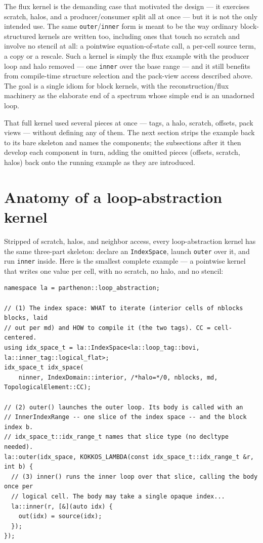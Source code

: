 \documentclass[11pt]{article}
\newcommand{\code}[1]{\lstinline[basicstyle=\ttfamily]|#1|}
\begin{document}
The flux kernel is the demanding case that motivated the design --- it exercises
scratch, halos, and a producer/consumer split all at once --- but it is not the
only intended use. The same \code{outer}/\code{inner} form is meant to be the way
ordinary block-structured kernels are written too, including ones that touch no
scratch and involve no stencil at all: a pointwise equation-of-state call, a
per-cell source term, a copy or a rescale. Such a kernel is simply the flux
example with the producer loop and halo removed --- one \code{inner} over the base
range --- and it still benefits from compile-time structure selection and the
pack-view access described above. The goal is a single idiom for block kernels,
with the reconstruction/flux machinery as the elaborate end of a spectrum whose
simple end is an unadorned loop.

That full kernel used several pieces at once --- tags, a halo, scratch, offsets,
pack views --- without defining any of them. The next section strips the example
back to its bare skeleton and names the components; the subsections after it then
develop each component in turn, adding the omitted pieces (offsets, scratch, halos)
back onto the running example as they are introduced.

\section{Anatomy of a loop-abstraction kernel}
\label{sec:anatomy}

Stripped of scratch, halos, and neighbor access, every loop-abstraction kernel has
the same three-part skeleton: declare an \code{IndexSpace}, launch \code{outer}
over it, and run \code{inner} inside. Here is the smallest complete example --- a
pointwise kernel that writes one value per cell, with no scratch, no halo, and no
stencil:
\begin{lstlisting}
namespace la = parthenon::loop_abstraction;

// (1) The index space: WHAT to iterate (interior cells of nblocks blocks, laid
// out per md) and HOW to compile it (the two tags). CC = cell-centered.
using idx_space_t = la::IndexSpace<la::loop_tag::bovi, la::inner_tag::logical_flat>;
idx_space_t idx_space(
    ninner, IndexDomain::interior, /*halo=*/0, nblocks, md, TopologicalElement::CC);

// (2) outer() launches the outer loop. Its body is called with an
// InnerIndexRange -- one slice of the index space -- and the block index b.
// idx_space_t::idx_range_t names that slice type (no decltype needed).
la::outer(idx_space, KOKKOS_LAMBDA(const idx_space_t::idx_range_t &r, int b) {
  // (3) inner() runs the inner loop over that slice, calling the body once per
  // logical cell. The body may take a single opaque index...
  la::inner(r, [&](auto idx) {
    out(idx) = source(idx);
  });
});
\end{lstlisting}
\end{document}
